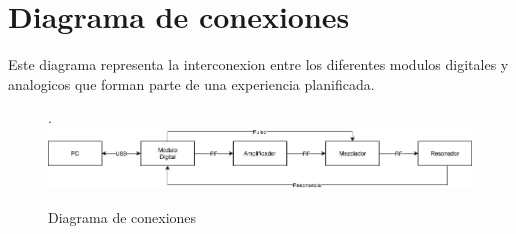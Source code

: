 \section{Diagrama de conexiones}

Este diagrama representa la interconexion entre los diferentes modulos digitales y analogicos que forman
parte de una experiencia planificada.

\begin{figure}[!htb].
    \includegraphics[width=\linewidth]{../figures/d1.jpg}
    \caption{Diagrama de conexiones}
    \label{fig:d1}
\end{figure}
  

